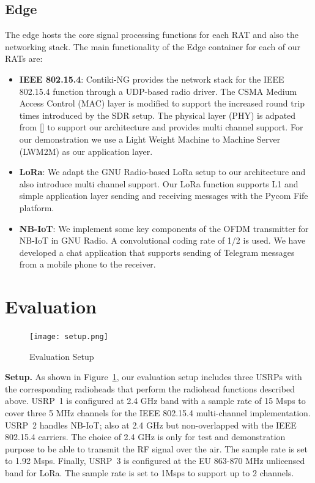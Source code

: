 \documentclass[10pt,emptycopyrightspace]{ewsn-proc}
\newcommand{\fakepar}[1]{\noindent\textbf{#1.}}
\begin{document}
\subsection{Edge}
The edge hosts the core signal processing functions for each RAT and also the networking stack. The main functionality of the Edge container for each of our RATs are:
\begin{itemize}
	\item \textbf{IEEE 802.15.4}: Contiki-NG provides the network stack for the IEEE 802.15.4 function through a UDP-based radio driver. The CSMA Medium Access Control (MAC) layer is modified to support the increased round trip times introduced by the SDR setup. The physical layer (PHY) is adpated from [] to support our architecture and provides multi channel support. For our demonstration we use a Light Weight Machine to Machine Server (LWM2M) as our application layer. 		
	\item \textbf{LoRa}: We adapt the GNU Radio-based LoRa setup to our architecture and also introduce multi channel support. Our LoRa function supports L1 and simple application layer sending and receiving messages with the Pycom Fife platform.
	

	\item \textbf{NB-IoT}: We implement some key components of the OFDM transmitter for NB-IoT in GNU Radio. A convolutional coding rate of 1/2 is used. We have developed a chat application that supports sending of Telegram messages from a mobile phone to the receiver.
\end{itemize}


\section{Evaluation}

\begin{figure}[t]
  \vspace{-0.5cm}
  \centering
	\texttt{[image: setup.png]}
	\caption{Evaluation Setup}
	\label{fig:setup}
\end{figure}

\fakepar{Setup} As shown in Figure~\ref{fig:setup}, our evaluation setup includes
three USRPs with the corresponding radioheads that perform the
radiohead functions described above. USRP~1 is configured at 2.4 GHz
band with a sample rate of 15 Msps to cover three 5 MHz channels for
the IEEE 802.15.4 multi-channel implementation. USRP~2 handles NB-IoT;
also at 2.4 GHz but non-overlapped with the IEEE 802.15.4
carriers. The choice of 2.4 GHz is only for test and demonstration
purpose to be able to transmit the RF signal over the air. The sample
rate is set to 1.92 Msps. Finally, USRP~3 is
configured at the EU 863-870 MHz unlicensed band for LoRa. The sample
rate is set to 1Msps to support up to 2 channels.
\end{document}
